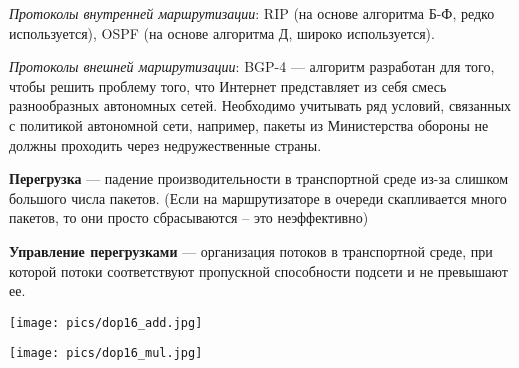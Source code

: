\textit{Протоколы внутренней маршрутизации}: RIP (на основе алгоритма Б-Ф, редко используется), OSPF (на основе алгоритма Д, широко используется).

\textit{Протоколы внешней маршрутизации}: BGP-4 --- алгоритм разработан для того, чтобы решить проблему того, что Интернет представляет из себя смесь разнообразных автономных сетей. Необходимо учитывать ряд условий, связанных с политикой автономной сети, например, пакеты из Министерства обороны не должны проходить через недружественные страны.


\textbf{Перегрузка} --- падение производительности в транспортной среде из-за слишком большого числа пакетов. (Если на маршрутизаторе в очереди скапливается много пакетов, то они просто сбрасываются -- это неэффективно)

\textbf{Управление перегрузками} --- организация потоков в транспортной среде, при которой потоки соответствуют пропускной способности подсети и не превышают ее.


\texttt{[image: pics/dop16\_add.jpg]}

\texttt{[image: pics/dop16\_mul.jpg]}

